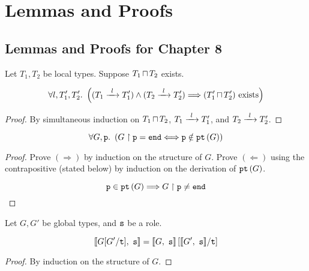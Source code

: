 \chapter{Lemmas and Proofs}

\section{Lemmas and Proofs for Chapter 8}
\label{section:proofs}

\begin{lemma}
Let $T_1, T_2$ be local types.
Suppose ${T_1}\,{\sqcap}\,{T_2}$ exists.

\[
\forall l, T'_1, T'_2. ~ \left(
(\treduce{T_1}{T'_1}{l}) \wedge (\treduce{T_2}{T'_2}{l})
	\Longrightarrow
(\tmerge{T'_1}{T'_2}) \text{ exists} \right)
\]

\label{lem:localltspreservemerge}
\end{lemma}

\begin{proof}
By simultaneous induction on
${T_1}\,{\sqcap}\,{T_2}$, $\treduce{T_1}{T'_1}{l}$,
and $\treduce{T_2}{T'_2}{l}$.

\end{proof}

\begin{lemma}

\[
\forall G, {\mathtt{p}}.~ \left(
{G} \upharpoonright {\mathtt{p}} = \textnormal{\texttt{end}} \Longleftrightarrow {\mathtt{p}} \notin {\textnormal{\texttt{pt}}\left({G}\right)}
\right)
\]

\label{lem:projpt}
\end{lemma}

\begin{proof} 
Prove $(\Longrightarrow)$ by induction on the structure of $G$.
Prove $(\Longleftarrow)$ using the contrapositive (stated below)
by induction on the derivation of ${\textnormal{\texttt{pt}}\left({G}\right)}$.

\[
{\mathtt{p}} \in {\textnormal{\texttt{pt}}\left({G}\right)} \Longrightarrow {G} \upharpoonright {\mathtt{p}} \neq \textnormal{\texttt{end}}
\]
\end{proof}

\begin{lemma}
Let $G, G'$ be global types, and ${\mathtt{s}}$ be a role.

\[
\llbracket {G[G' / \textnormal{\texttt{t}}]},~{\mathtt{s}} \rrbracket = \llbracket {G},~{\mathtt{s}} \rrbracket\left[ \llbracket {G'},~{\mathtt{s}} \rrbracket / \textnormal{\texttt{t}} \right]
\]

\label{lem:encsub}
\end{lemma}

\begin{proof}
By induction on the structure of $G$.
\end{proof}

